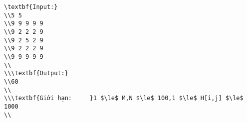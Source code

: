 \begin{verbatim}
\textbf{Input:}
\\5 5
\\9 9 9 9 9
\\9 2 2 2 9
\\9 2 5 2 9
\\9 2 2 2 9
\\9 9 9 9 9
\\
\\\textbf{Output:}
\\60
\\
\\\textbf{Giới hạn:     }1 $\le$ M,N $\le$ 100,1 $\le$ H[i,j] $\le$ 1000
\\\end{verbatim}